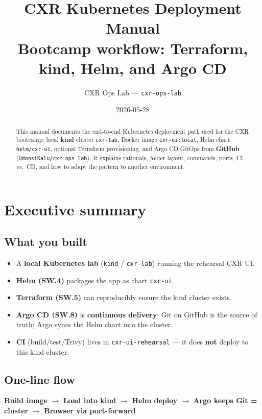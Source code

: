 \documentclass[11pt,a4paper]{report}
\title{CXR Kubernetes Deployment Manual\\
\large Bootcamp workflow: Terraform, kind, Helm, and Argo CD}
\author{CXR Ops Lab --- \texttt{cxr-ops-lab}}
\date{2026-05-28}
\begin{document}
\maketitle
\begin{abstract}
This manual documents the end-to-end Kubernetes deployment path used for the CXR bootcamp:
local \textbf{kind} cluster \texttt{cxr-lab}, Docker image \texttt{cxr-ui:local}, Helm chart
\texttt{helm/cxr-ui}, optional Terraform provisioning, and Argo CD GitOps from
\textbf{GitHub} (\texttt{UdonsiKalu/cxr-ops-lab}). It explains rationale, folder layout,
commands, ports, CI vs.\ CD, and how to adapt the pattern to another environment.
\end{abstract}
\tableofcontents
\newpage

\chapter{Executive summary}

\section{What you built}
\begin{itemize}
  \item A \textbf{local Kubernetes lab} (\texttt{kind} / \texttt{cxr-lab}) running the rehearsal CXR UI.
  \item \textbf{Helm (SW.4)} packages the app as chart \texttt{cxr-ui}.
  \item \textbf{Terraform (SW.5)} can reproducibly ensure the kind cluster exists.
  \item \textbf{Argo CD (SW.8)} is \textbf{continuous delivery}: Git on GitHub is the source of truth; Argo syncs the Helm chart into the cluster.
  \item \textbf{CI} (build/test/Trivy) lives in \texttt{cxr-ui-rehearsal} --- it does \textbf{not} deploy to this kind cluster.
\end{itemize}

\section{One-line flow}
\begin{center}
\textbf{Build image} $\rightarrow$ \textbf{Load into kind} $\rightarrow$ \textbf{Helm deploy} $\rightarrow$ \textbf{Argo keeps Git = cluster} $\rightarrow$ \textbf{Browser via port-forward}
\end{center}
\end{document}
